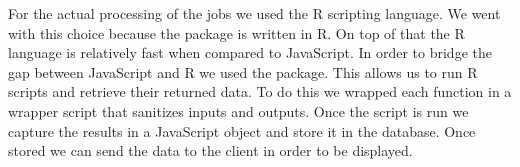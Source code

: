 \begin{flushleft}
For the actual processing of the jobs we used the R scripting language. We went with this choice because the  package is written in R. On top of that the R language is relatively fast when compared to JavaScript. In order to bridge the gap between JavaScript and R we used the  package. This allows us to run R scripts and retrieve their returned data. To do this we wrapped each  function in a wrapper script that sanitizes inputs and outputs. Once the script is run we capture the results in a JavaScript object and store it in the database. Once stored we can send the data to the client in order to be displayed.\par

\end{flushleft}
